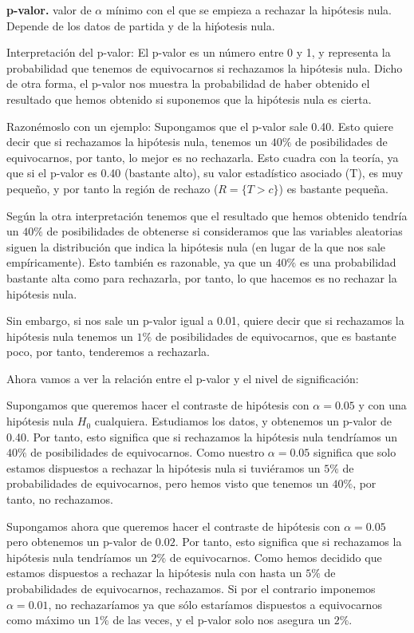 \documentclass[palatino,nochap]{apuntes}
\begin{document}
\begin{defn}{\textbf{p-valor. }}
valor de $\alpha$ mínimo con el que se empieza a rechazar la hipótesis nula. Depende de los datos de partida y de la hiṕotesis nula.
\begin{expla}
Interpretación del p-valor: El p-valor es un número entre 0 y 1, y representa la probabilidad que tenemos de equivocarnos si rechazamos la hipótesis nula. Dicho de otra forma,  el p-valor nos muestra la probabilidad de haber obtenido el resultado que hemos obtenido si suponemos que la hipótesis nula es cierta.

Razonémoslo con un ejemplo:
Supongamos que el p-valor sale 0.40. Esto quiere decir que si rechazamos la hipótesis nula, tenemos un $40\%$ de posibilidades de equivocarnos, por tanto, lo mejor es no rechazarla. Esto cuadra con la teoría, ya que si el p-valor es 0.40 (bastante alto), su valor estadístico asociado (T), es muy pequeño, y por tanto la región de rechazo ($R=\{T>c\}$) es bastante pequeña.

Según la otra interpretación tenemos que el resultado que hemos obtenido tendría un $40\%$ de posibilidades de obtenerse si consideramos que las variables aleatorias siguen la distribución que indica la hipótesis nula (en lugar de la que nos sale empíricamente). Esto también es razonable, ya que un $40\%$ es una probabilidad bastante alta como para rechazarla, por tanto, lo que hacemos es no rechazar la hipótesis nula.

Sin embargo, si nos sale un p-valor igual a 0.01, quiere decir que si rechazamos la hipótesis nula tenemos un $1\%$ de posibilidades de equivocarnos, que es bastante poco, por tanto, tenderemos a rechazarla.
\end{expla}
\end{defn}

Ahora vamos a ver la relación entre el p-valor y el nivel de significación:
\begin{expla}
Supongamos que queremos hacer el contraste de hipótesis con $\alpha=0.05$ y con una hipótesis nula $H_0$ cualquiera. Estudiamos los datos, y obtenemos un p-valor de 0.40. Por tanto, esto significa que si rechazamos la hipótesis nula tendríamos un $40\%$ de posibilidades de equivocarnos. Como nuestro $\alpha=0.05$ significa que solo estamos dispuestos a rechazar la hipótesis nula si tuviéramos un $5\%$ de probabilidades de equivocarnos, pero hemos visto que tenemos un $40\%$, por tanto, no rechazamos.

Supongamos ahora que queremos hacer el contraste de hipótesis con $\alpha=0.05$ pero obtenemos un p-valor de $0.02$. Por tanto, esto significa que si rechazamos la hipótesis nula tendríamos un $2\%$ de equivocarnos. Como hemos decidido que estamos dispuestos a rechazar la hipótesis nula con hasta un $5\%$ de probabilidades de equivocarnos, rechazamos. Si por el contrario imponemos $\alpha=0.01$, no rechazaríamos ya que sólo estaríamos dispuestos a equivocarnos como máximo un $1\%$ de las veces, y el p-valor solo nos asegura un $2\%$.
\end{expla}
\end{document}
